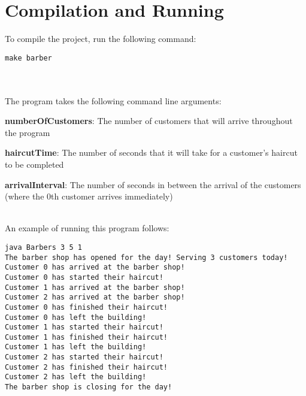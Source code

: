 \documentclass{article}%
\begin{document}
\section*{Compilation and Running}

To compile the project, run the following command:

\lstset{language=Bash}
\begin{lstlisting}[frame=single]
make barber
\end{lstlisting}\\
\\
The program takes the following command line arguments:
\begin{itemize}
    \begin{item}
        \textbf{numberOfCustomers}: The number of customers that will arrive throughout the program
    \end{item}

    \begin{item}
        \textbf{haircutTime}: The number of seconds that it will take for a customer's haircut to be completed
    \end{item}

    \begin{item}
        \textbf{arrivalInterval}: The number of seconds in between the arrival of the customers (where the 0th customer arrives immediately)
    \end{item}
\end{itemize}
\\
An example of running this program follows:
\begin{verbatim}
java Barbers 3 5 1
The barber shop has opened for the day! Serving 3 customers today!
Customer 0 has arrived at the barber shop!
Customer 0 has started their haircut!
Customer 1 has arrived at the barber shop!
Customer 2 has arrived at the barber shop!
Customer 0 has finished their haircut!
Customer 0 has left the building!
Customer 1 has started their haircut!
Customer 1 has finished their haircut!
Customer 1 has left the building!
Customer 2 has started their haircut!
Customer 2 has finished their haircut!
Customer 2 has left the building!
The barber shop is closing for the day!
\end{verbatim}
\end{document}
